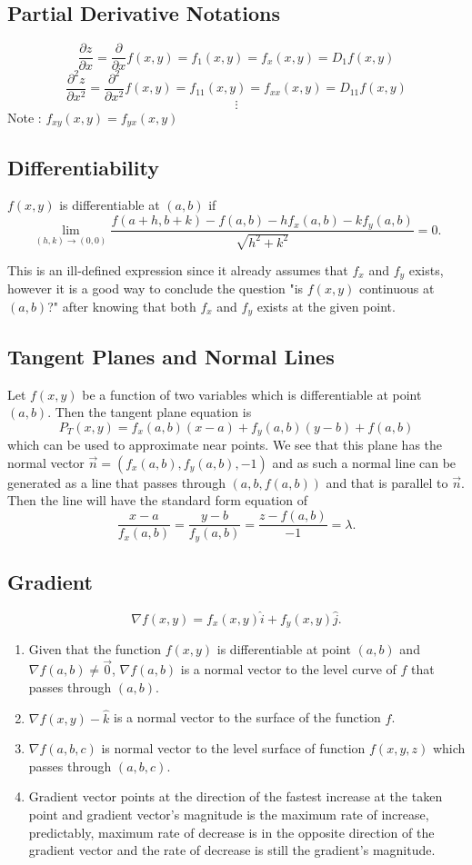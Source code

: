\documentclass[12pt]{article}
\begin{document}
\subsection{Partial Derivative Notations}
$$\dfrac{\partial z}{\partial x} = \dfrac{\partial}{\partial x} f(x,y) = f_1(x,y)=f_x(x,y)=D_1f(x,y)$$
$$\dfrac{\partial^2 z}{\partial x^2} = \dfrac{\partial^2}{\partial x^2} f(x,y) = f_{11}(x,y)=f_{xx}(x,y)=D_{11}f(x,y)$$
$$\vdots$$
Note : $\displaystyle{f_{xy}(x,y)=f_{yx}(x,y)}$
\subsection{Differentiability}
$f(x,y)$ is differentiable at $(a,b)$ if $$\lim \limits_{(h,k)\to (0,0)} \dfrac{f(a+h,b+k)-f(a,b)-hf_x(a,b)-kf_y(a,b)}{\sqrt{h^2+k^2}}=0.$$

This is an ill-defined expression since it already assumes that $f_x$ and $f_y$ exists, however it is a good way to conclude the question "is $f(x,y)$ continuous at $(a,b)$?" after knowing that both $f_x$ and $f_y$ exists at the given point.
\subsection{Tangent Planes and Normal Lines}
Let $f(x,y)$ be a function of two variables which is differentiable at point $(a,b)$. Then the tangent plane equation is
$$P_T(x,y)= f_x(a,b)(x-a) + f_y(a,b)(y-b)+f(a,b)$$
which can be used to approximate near points. We see that this plane has the normal vector $\vec n = (f_x(a,b),f_y(a,b),-1)$ and as such a normal line can be generated as a line that passes through $(a,b,f(a,b))$ and that is parallel to $\vec n$. Then the line will have the standard form equation of $$\dfrac{x-a}{f_x(a,b)}=\dfrac{y-b}{f_y(a,b)} = \dfrac{z-f(a,b)}{-1}=\lambda.$$
\subsection{Gradient}
$$\nabla f(x,y)=f_x(x,y)\hat i + f_y(x,y) \hat j.$$
\begin{enumerate}
\item Given that the function $f(x,y)$ is differentiable at point $(a,b)$ and $\nabla f(a,b) \neq \vec 0$, $\nabla f(a,b)$ is a normal vector to the level curve of $f$ that passes through $(a,b)$.
\item $\nabla f(x,y) - \hat k$ is a normal vector to the surface of the function $f$.
\item $\nabla f(a,b,c)$ is normal vector to the level surface of function $f(x,y,z)$ which passes through $(a,b,c)$. 
\item Gradient vector points at the direction of the fastest increase at the taken point and gradient vector's magnitude is the maximum rate of increase, predictably, maximum rate of decrease is in the opposite direction of the gradient vector and the rate of decrease is still the gradient's magnitude.
\end{enumerate}
\end{document}
